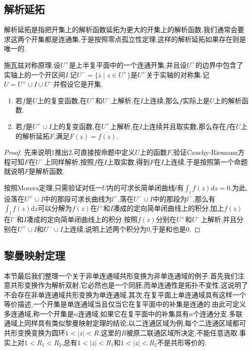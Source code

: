 \subsection{解析延拓}

解析延拓是指把开集上的解析函数延拓为更大的开集上的解析函数.我们通常会要求这两个开集都是连通集,于是按照零点孤立性定理,这样的解析延拓如果存在则是唯一的.

施瓦兹对称原理.设$U^+$是上半复平面中的一个连通开集,并且设$U^+$的边界中包含了实轴上的一个开区间$I$.记$U^-=\{\overline{z}\mid z\in U^+\}$是$U^+$关于实轴的对称集.记$U=U^+\cup I\cup U^-$并假设它是开集.
\begin{enumerate}
	\item 若$f$是$U$上的复变函数,在$U^+$和$U^-$上解析,在$I$上连续,那么$f$实际上是$U$上的解析函数.
	\item 若$f$是$U^+\cup I$上的复变函数,在$U^+$上解析,在$I$上连续并且取实数,那么存在$f$在$U$上的解析延拓$F$,满足$F(z)=\overline{f(\overline{z})}$.
\end{enumerate}
\begin{proof}
	
	先来说明1推出2.可直接按命题中定义$U$上的函数$F$,验证Cauchy-Riemann方程可知$F$在$U^-$上同样解析,按照$f$在$I$上取实数,得到$F$在$I$上连续,于是按照第一个命题就说明$F$是解析函数.
	
	按照Morera定理,只需验证对任一$U$内的可求长简单闭曲线$l$有$\int_lf(z)\mathrm{d}z=0$.为此,设落在$U^+\cup I$中的那段可求长曲线为$l^+$,落在$U^-\cup I$中的那段为$l^-$,那么有$\int_lf(z)\mathrm{d}z$可以分解为$f(z)$在$l^+$和$I$凑成的定向简单闭曲线上的积分,加上$f(z)$在$l^-$和$I$凑成的定向简单闭曲线上的积分.按照$f(z)$分别在$U^+$和$U^-$上解析,并且分别在$U^+\cup I$和$U^-\cup I$上连续,说明上述两个积分为0,于是和也是0.
\end{proof}
\newpage
\subsection{黎曼映射定理}

本节最后我们整理一个关于非单连通域共形变换为非单连通域的例子.首先我们注意共形变换作为解析双射,它必然也是一个同胚,而单连通性是拓扑不变性,这说明了不会存在非单连通域共形变换为单连通域.其次,在复平面上单连通域具有这样一个等价描述,一个开集是单连通域当且仅当它在复平面中的补集是连通的.由此可定义多连通域,称一个开集是$n$连通域,如果它在复平面中的补集具有$n$个连通分支.多联通域上同样具有类似黎曼映射定理的结论,以二连通区域为例,每个二连通区域都可共形变换变换为圆环$1<|z|<R$.这里的$R$被原二联通区域所决定,不能任意选取.事实上对$1<R_1<R_2$,总有$1<|z|<R_1$和$1<|z|<R_2$不是共形等价的.


